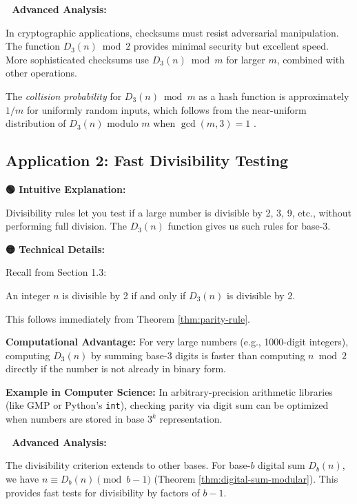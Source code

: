\textbf{🔴 Advanced Analysis:}

In cryptographic applications, checksums must resist adversarial manipulation. The function $D_3(n) \bmod 2$ provides minimal security but excellent speed. More sophisticated checksums use $D_3(n) \bmod m$ for larger $m$, combined with other operations.

The \textit{collision probability} for $D_3(n) \bmod m$ as a hash function is approximately $1/m$ for uniformly random inputs, which follows from the near-uniform distribution of $D_3(n)$ modulo $m$ when $\gcd(m, 3) = 1$ \cite{knuth1997}.

\subsection{Application 2: Fast Divisibility Testing}

\textbf{🟢 Intuitive Explanation:}

Divisibility rules let you test if a large number is divisible by 2, 3, 9, etc., without performing full division. The $D_3(n)$ function gives us such rules for base-3.

\textbf{🟡 Technical Details:}

Recall from Section 1.3:

\begin{theorem}
\label{thm:div-by-2-app}
An integer $n$ is divisible by 2 if and only if $D_3(n)$ is divisible by 2.
\end{theorem}

This follows immediately from Theorem \ref{thm:parity-rule}.

\textbf{Computational Advantage:} For very large numbers (e.g., 1000-digit integers), computing $D_3(n)$ by summing base-3 digits is faster than computing $n \bmod 2$ directly if the number is not already in binary form.

\textbf{Example in Computer Science:} In arbitrary-precision arithmetic libraries (like GMP or Python's \texttt{int}), checking parity via digit sum can be optimized when numbers are stored in base $3^k$ representation.

\textbf{🔴 Advanced Analysis:}

The divisibility criterion extends to other bases. For base-$b$ digital sum $D_b(n)$, we have $n \equiv D_b(n) \pmod{b-1}$ (Theorem \ref{thm:digital-sum-modular}). This provides fast tests for divisibility by factors of $b-1$.

